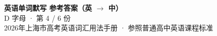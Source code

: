 \documentclass[10pt,a4paper]{article}
\begin{document}
\pagestyle{plain}

\begin{center}
{\LARGE\bfseries 英语单词默写 \quad 参考答案（英 $\to$ 中）}\\[0.22em]
{\large D 字母 · 第 4 / 6 份}\\[0.18em]
{\small 2026年上海市高考英语词汇用法手册 · 参照普通高中英语课程标准}
\end{center}

\vspace{0.2em}
\noindent{\color{rulegray}\rule{\textwidth}{0.8pt}}

\vspace{0.35em}

\vspace{0.25em}
\renewcommand{\arraystretch}{1.32}
\end{document}
